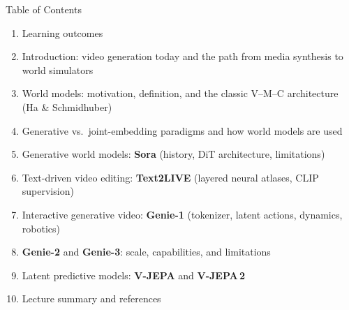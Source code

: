 \begin{frame}{Table of Contents}
  \small
  \begin{enumerate}\itemsep0.1em
    \item Learning outcomes
    \item Introduction: video generation today and the path from media synthesis to world simulators
    \item World models: motivation, definition, and the classic V--M--C architecture (Ha \& Schmidhuber)
    \item Generative vs.\ joint-embedding paradigms and how world models are used
    \item Generative world models: \textbf{Sora} (history, DiT architecture, limitations)
    \item Text-driven video editing: \textbf{Text2LIVE} (layered neural atlases, CLIP supervision)
    \item Interactive generative video: \textbf{Genie-1} (tokenizer, latent actions, dynamics, robotics)
    \item \textbf{Genie-2} and \textbf{Genie-3}: scale, capabilities, and limitations
    \item Latent predictive models: \textbf{V-JEPA} and \textbf{V-JEPA\,2}
    \item Lecture summary and references
  \end{enumerate}
\end{frame}
